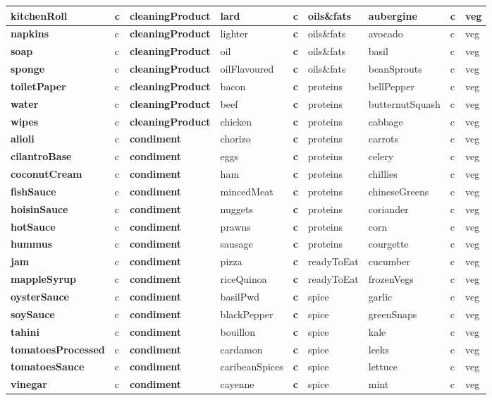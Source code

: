 \documentclass[]{article}
\begin{document}
\begin{table}
\begin{tabular}[t]{>{\bfseries}l|l|>{\bfseries}l|l|>{\bfseries}l|l|l|l|l}
\hline
kitchenRoll & c & cleaningProduct & lard & c & oils\&fats & aubergine & c & veg\\
\hline
napkins & c & cleaningProduct & lighter & c & oils\&fats & avocado & c & veg\\
\hline
soap & c & cleaningProduct & oil & c & oils\&fats & basil & c & veg\\
\hline
sponge & c & cleaningProduct & oilFlavoured & c & oils\&fats & beanSprouts & c & veg\\
\hline
toiletPaper & c & cleaningProduct & bacon & c & proteins & bellPepper & c & veg\\
\hline
water & c & cleaningProduct & beef & c & proteins & butternutSquash & c & veg\\
\hline
wipes & c & cleaningProduct & chicken & c & proteins & cabbage & c & veg\\
\hline
alioli & c & condiment & chorizo & c & proteins & carrots & c & veg\\
\hline
cilantroBase & c & condiment & eggs & c & proteins & celery & c & veg\\
\hline
coconutCream & c & condiment & ham & c & proteins & chillies & c & veg\\
\hline
fishSauce & c & condiment & mincedMeat & c & proteins & chineseGreens & c & veg\\
\hline
hoisinSauce & c & condiment & nuggets & c & proteins & coriander & c & veg\\
\hline
hotSauce & c & condiment & prawns & c & proteins & corn & c & veg\\
\hline
hummus & c & condiment & sausage & c & proteins & courgette & c & veg\\
\hline
jam & c & condiment & pizza & c & readyToEat & cucumber & c & veg\\
\hline
mappleSyrup & c & condiment & riceQuinoa & c & readyToEat & frozenVegs & c & veg\\
\hline
oysterSauce & c & condiment & basilPwd & c & spice & garlic & c & veg\\
\hline
soySauce & c & condiment & blackPepper & c & spice & greenSnaps & c & veg\\
\hline
tahini & c & condiment & bouillon & c & spice & kale & c & veg\\
\hline
tomatoesProcessed & c & condiment & cardamon & c & spice & leeks & c & veg\\
\hline
tomatoesSauce & c & condiment & caribeanSpices & c & spice & lettuce & c & veg\\
\hline
vinegar & c & condiment & cayenne & c & spice & mint & c & veg\\

\end{tabular}
\end{table}
\end{document}
